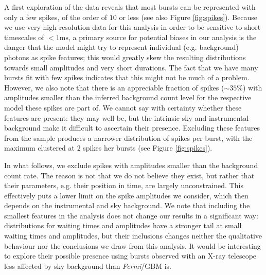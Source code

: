 \documentclass[12pt]{emulateapj}
\newcommand{\project}[1]{\textsl{#1}}
\newcommand{\fermi}{\project{Fermi}}
\begin{document}
A first exploration of the data reveals that most bursts can be represented with only a few spikes, of the order of 
$10$ or less (see also Figure \ref{fig:spikes}). Because we use very high-resolution data for this analysis in order to
be sensitive to short timescales of $< 1\mathrm{ms}$, a primary source for potential biases in our analysis is the
danger that the model might try to represent individual (e.g. background) photons as spike features; this would greatly
skew the resulting distributions towards small amplitudes and very short durations. The fact that we have many bursts
fit with few spikes indicates that this might not be much of a problem. However, we also note that there is an appreciable fraction
of spikes ($\sim 35\%$) with amplitudes smaller than the inferred background count level for the respective model these spikes 
are part of. We cannot say with certainty whether these features are present: they may well be, but the intrinsic sky and instrumental background
 make it difficult to ascertain their presence. Excluding these features from the sample produces a narrower distribution
of spikes per burst, with the maximum clustered at $2$ spikes her bursts (see Figure \ref{fig:spikes}).

In what follows, we exclude spikes with amplitudes smaller than the background count rate. The reason is not that we do not believe
they exist, but rather that their parameters, e.g. their position in time, are largely unconstrained.
This effectively puts a lower limit on the spike amplitudes we consider, which then depends on the instrumental and sky background. We note
that including the smallest features in the analysis does not change our results in a significant way: distributions for 
waiting times and amplitudes have a stronger tail at small waiting times and amplitudes, but their inclusions changes neither
the qualitative behaviour nor the conclusions we draw from this analysis. It would be interesting to explore their possible presence
using bursts observed with an X-ray telescope less affected by sky background than \fermi/GBM is.
\end{document}
